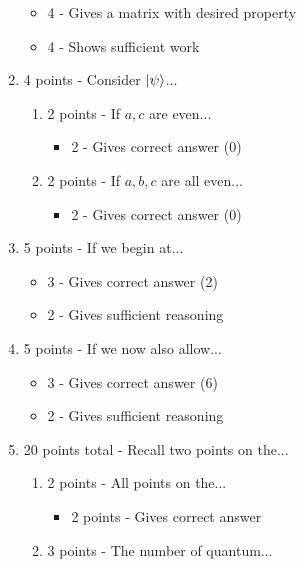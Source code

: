\documentclass[12pt]{article}
\begin{document}
\begin{enumerate}[font=\bfseries]
        \begin{itemize}
            \item 4 - Gives a matrix with desired property
            \item 4 - Shows sufficient work
        \end{itemize}
    \item 4 points - Consider $\ket{\psi}$...
        \begin{enumerate}
            \item 2 points - If $a,c$ are even...
                \begin{itemize}
                    \item 2 - Gives correct answer (0)
                \end{itemize}
            \item 2 points - If $a,b,c$ are all even...
                \begin{itemize}
                    \item 2 - Gives correct answer (0)
                \end{itemize}
        \end{enumerate}
    \item 5 points - If we begin at...
        \begin{itemize}
            \item 3 - Gives correct answer (2)
            \item 2 - Gives sufficient reasoning
        \end{itemize}
    \item 5 points - If we now also allow...
        \begin{itemize}
            \item 3 - Gives correct answer (6)
            \item 2 - Gives sufficient reasoning
        \end{itemize}
    \item 20 points total - Recall two points on the...
        \begin{enumerate}
            \item 2 points - All points on the...
                \begin{itemize}
                    \item 2 points - Gives correct answer 
                \end{itemize}
            \item 3 points - The number of quantum...
                \begin{itemize}

\end{itemize}
\end{enumerate}
\end{enumerate}
\end{document}
